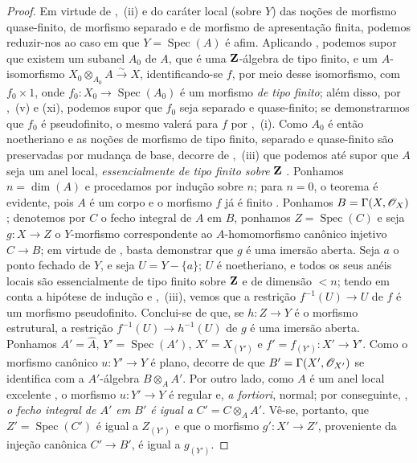 \begin{proof}
Em virtude de ,~(ii) e do caráter local (sobre $Y$) das noções de morfismo quase-finito, de morfismo separado e de morfismo de apresentação finita, podemos reduzir-nos ao caso em que $Y=\operatorname{Spec}(A)$ é afim.
Aplicando , podemos supor que existem um subanel $A_0$ de $A$, que é uma $\mathbf{Z}$-álgebra de tipo finito, e um $A$-isomorfismo $X_0\otimes_{A_0}A\xrightarrow{\sim}X$, identificando-se $f$, por meio desse isomorfismo, com $f_0\times 1$, onde $f_0:X_0\to\operatorname{Spec}(A_0)$ é um morfismo \emph{de tipo finito}; além disso, por ,~(v) e (xi), podemos supor que $f_0$ seja separado e quase-finito; se demonstrarmos que $f_0$ é pseudofinito, o mesmo valerá para $f$ por ,~(i).
Como $A_0$ é então noetheriano e as noções de morfismo de tipo finito, separado e quase-finito são preservadas por mudança de base, decorre de ,~(iii) que podemos até supor que $A$ seja um anel local, \emph{essencialmente de tipo finito sobre} $\mathbf{Z}$ .
Ponhamos $n=\dim(A)$ e procedamos por indução sobre $n$; para $n=0$, o teorema é evidente, pois $A$ é um corpo e o morfismo $f$ já é finito .
Ponhamos $B=\Gamma(X,\mathscr{O}_X)$; denotemos por $C$ o fecho integral de $A$ em $B$, ponhamos $Z=\operatorname{Spec}(C)$ e seja $g:X\to Z$ o $Y$-morfismo correspondente ao $A$-homomorfismo canônico injetivo $C\to B$; em virtude de , basta demonstrar que $g$ é uma imersão aberta.
Seja $a$ o ponto fechado de $Y$, e seja $U=Y-\{a\}$; $U$ é noetheriano, e todos os seus anéis locais são essencialmente de tipo finito sobre $\mathbf{Z}$ e de dimensão $<n$; tendo em conta a hipótese de indução e ,~(iii), vemos que a restrição $f^{-1}(U)\to U$ de $f$ é um morfismo pseudofinito.
Conclui-se de  que, se $h:Z\to Y$ é o morfismo estrutural, a restrição $f^{-1}(U)\to h^{-1}(U)$ de $g$ é uma imersão aberta.
Ponhamos $A'=\hat{A}$, $Y'=\operatorname{Spec}(A')$, $X'=X_{(Y')}$ e $f'=f_{(Y')}:X'\to Y'$.
Como o morfismo canônico $u:Y'\to Y$ é plano, decorre de  que $B'=\Gamma(X',\mathscr{O}_{X'})$ se identifica com a $A'$-álgebra $B\otimes_A A'$.
Por outro lado, como $A$ é um anel local excelente , o morfismo $u:Y'\to Y$ é regular e, \emph{a fortiori}, normal; por conseguinte, , \emph{o fecho integral de $A'$ em $B'$ é igual a} $C'=C\otimes_A A'$.
Vê-se, portanto, que $Z'=\operatorname{Spec}(C')$ é igual a $Z_{(Y')}$ e que o morfismo $g':X'\to Z'$, proveniente da injeção canônica $C'\to B'$, é igual a $g_{(Y')}$.

\end{proof}
